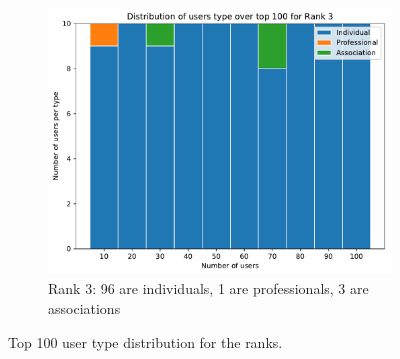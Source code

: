 \begin{figure}[htb]
	\hfill%
	\begin{subfigure}{.49\textwidth}
		\centering
		\includegraphics[width=1\textwidth]{figures/rank3-distribution.pdf}
		\caption{Rank 3: 96 are individuals, 1 are professionals, 3 are associations}
		\label{fig:rank3-distribution}
	\end{subfigure}
	\caption{Top 100 user type distribution for the ranks.}
	\label{fig:ranks-distribution}
\end{figure}
%